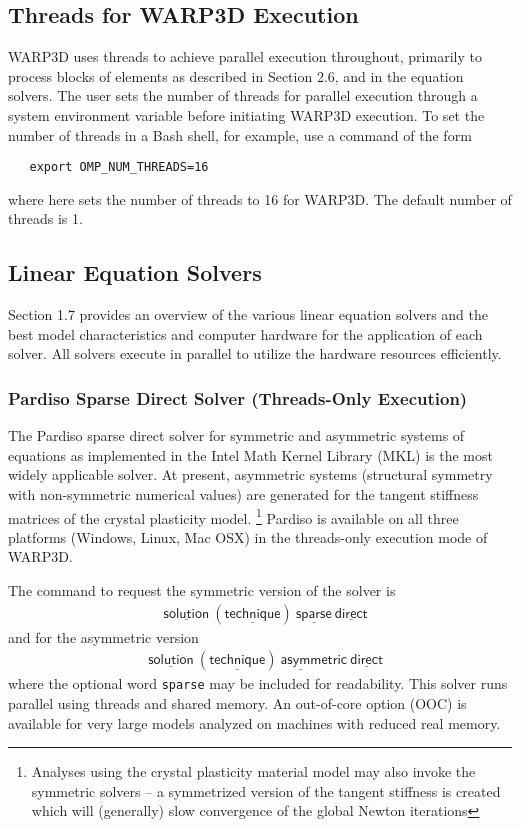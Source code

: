 \documentclass[11pt]{report}
\numberwithin{equation}{section}
\newcommand{\ttt} {\texttt}  %
\newcommand{\nin} {\noindent}
\newcommand{\ul} {\underline}
\newcommand{\hv} {\mathsf}   %
\begin{document}
\subsection{Threads for WARP3D Execution}
\nin
WARP3D uses threads to achieve parallel execution throughout, 
primarily to process blocks of elements as described in Section 2.6, and in
the equation solvers.
The user sets the number of threads for parallel execution 
through  a 
system environment variable before initiating WARP3D execution. To set the 
number of threads in
 a Bash shell, for example, use a  command of the form
 
\small
\begin{verbatim}
   export OMP_NUM_THREADS=16
\end{verbatim}
\normalsize
\nin where here sets the number of threads to 16 for WARP3D. The default number 
of threads is 1. 

\subsection{Linear Equation Solvers}
\nin
Section 1.7 provides an overview of the various linear equation solvers 
and the best model characteristics and computer hardware for the
application of each solver. All solvers execute in parallel to utilize the hardware
resources efficiently. 

\subsubsection{Pardiso Sparse Direct Solver (Threads-Only Execution)}
\nin
The Pardiso sparse direct solver for symmetric and asymmetric systems of equations 
as implemented in the Intel Math Kernel Library (MKL) is the most widely applicable
solver. At present, asymmetric systems (structural symmetry with non-symmetric
numerical values) 
are generated for the tangent stiffness matrices of the crystal plasticity model. 
\footnote{Analyses using the crystal plasticity material model may also invoke the 
symmetric solvers -- a symmetrized version of the tangent stiffness is
created which will (generally) slow convergence of the global Newton iterations}
Pardiso is available on all three platforms (Windows, Linux, Mac OSX) in the 
threads-only execution mode of WARP3D.

The command to request the symmetric version of the solver is
\begin{align*}
&\hv{\ul{solution}\ (\ul{technique})\ \ul{sparse}\ \ul{direct}} 
\end{align*}
and for the asymmetric version
\begin{align*}
&\hv{\ul{solution}\ (\ul{technique})\ \ul{asymm}etric \ \ul{direct}} 
\end{align*}
where the optional word \ttt{sparse} may be included for readability.
This solver runs parallel using threads and shared memory.  An out-of-core
option (OOC) is available for very large models analyzed
on machines with reduced real memory.
\end{document}
